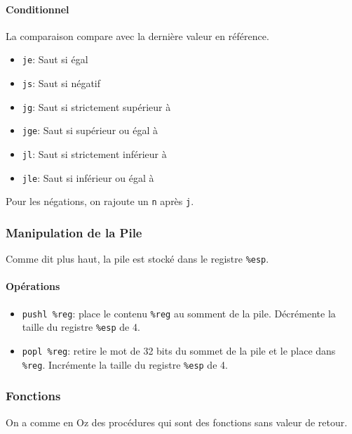 \paragraph{Conditionnel}\label{conditionnel}

La comparaison compare avec la dernière valeur en référence.

\begin{itemize}
\tightlist
\item
  \texttt{je}: Saut si égal
\item
  \texttt{js}: Saut si négatif
\item
  \texttt{jg}: Saut si strictement supérieur à
\item
  \texttt{jge}: Saut si supérieur ou égal à
\item
  \texttt{jl}: Saut si strictement inférieur à
\item
  \texttt{jle}: Saut si inférieur ou égal à
\end{itemize}

Pour les négations, on rajoute un \texttt{n} après \texttt{j}.

\subsubsection{Manipulation de la Pile}\label{manipulation-de-la-pile}

Comme dit plus haut, la pile est stocké dans le registre \texttt{\%esp}.

\paragraph{Opérations}\label{opuxe9rations}

\begin{itemize}
\tightlist
\item
  \texttt{pushl\ \%reg}: place le contenu \texttt{\%reg} au somment de
  la pile. Décrémente la taille du registre \texttt{\%esp} de 4.
\item
  \texttt{popl\ \%reg}: retire le mot de 32 bits du sommet de la pile et
  le place dans \texttt{\%reg}. Incrémente la taille du registre
  \texttt{\%esp} de 4.
\end{itemize}

\subsubsection{Fonctions}\label{fonctions}

On a comme en Oz des procédures qui sont des fonctions sans valeur de
retour.

